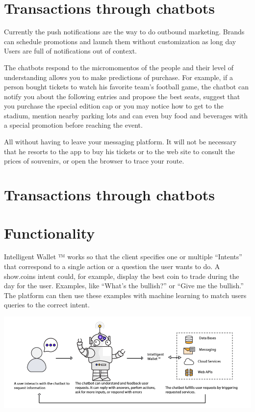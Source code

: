 \documentclass[	DIV=calc,%
							paper=letter,%
							fontsize=12pt%
                            ]{scrartcl}	 					%
\begin{document}
\section{\label{sec:level1}Transactions through chatbots}

Currently the push notifications are the way to do outbound marketing.
Brands can schedule promotions and launch them without customization as long day Users are full of notifications out of context.


The chatbots respond to the micromomentos of the people and their level of understanding allows you to make predictions of purchase. For example, if a person bought tickets to watch his favorite team's football game, the chatbot can notify you about the following entries and propose the best seats, suggest that you purchase the special edition cap or you may notice how to get to the stadium, mention nearby parking lots and can even buy food and beverages with a special promotion before reaching the event.


All without having to leave your messaging platform. It will not be necessary that he resorts to the app to buy his tickets or to the web site to consult the prices of souvenirs, or open the browser to trace your route.

\section{\label{sec:level1}Transactions through chatbots}

\section{\label{sec:level1}Functionality}

Intelligent Wallet ™ works so that the client specifies one or multiple “Intents” that correspond to a single action or a question the user wants to do. A show.coins intent could, for example, display the best coin to trade during the day for the user. Examples, like “What’s the bullish?” or “Give me the bullish.” The platform can then use these examples with machine learning to match users queries to the correct intent.

\includegraphics[scale=0.40]{img/Chatbot.png}\vspace*{1cm}
\end{document}
